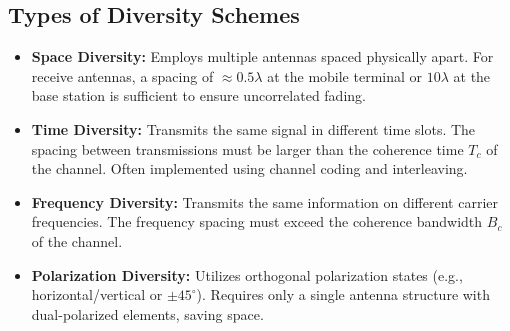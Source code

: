 \documentclass[12pt,a4paper]{article}
\begin{document}
\subsection{Types of Diversity Schemes}
\begin{itemize}[leftmargin=*, itemsep=3.0pt]
  \item \textbf{Space Diversity:} Employs multiple antennas spaced physically apart. For receive antennas, a spacing of $\approx 0.5\lambda$ at the mobile terminal or $10\lambda$ at the base station is sufficient to ensure uncorrelated fading.
  \item \textbf{Time Diversity:} Transmits the same signal in different time slots. The spacing between transmissions must be larger than the coherence time $T_c$ of the channel. Often implemented using channel coding and interleaving.
  \item \textbf{Frequency Diversity:} Transmits the same information on different carrier frequencies. The frequency spacing must exceed the coherence bandwidth $B_c$ of the channel.
  \item \textbf{Polarization Diversity:} Utilizes orthogonal polarization states (e.g., horizontal/vertical or $\pm 45^\circ$). Requires only a single antenna structure with dual-polarized elements, saving space.
\end{itemize}
\end{document}

